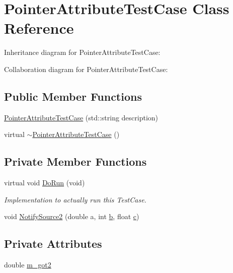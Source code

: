 \hypertarget{classPointerAttributeTestCase}{}\section{Pointer\+Attribute\+Test\+Case Class Reference}
\label{classPointerAttributeTestCase}


Inheritance diagram for Pointer\+Attribute\+Test\+Case\+:


Collaboration diagram for Pointer\+Attribute\+Test\+Case\+:
\subsection*{Public Member Functions}
\begin{DoxyCompactItemize}
\item 
\hyperlink{classPointerAttributeTestCase_a96191706656531cffa2a5f9305cc017a}{Pointer\+Attribute\+Test\+Case} (std\+::string description)
\item 
virtual \hyperlink{classPointerAttributeTestCase_a85d685a722e9657b63da389291973cbf}{$\sim$\+Pointer\+Attribute\+Test\+Case} ()
\end{DoxyCompactItemize}
\subsection*{Private Member Functions}
\begin{DoxyCompactItemize}
\item 
virtual void \hyperlink{classPointerAttributeTestCase_a4dd7258b7c7146be0a0ba69b9b5633d9}{Do\+Run} (void)
\begin{DoxyCompactList}\small\item\em Implementation to actually run this Test\+Case. \end{DoxyCompactList}\item 
void \hyperlink{classPointerAttributeTestCase_adb39bcf105f1cbc7345d27244dfcb3a9}{Notify\+Source2} (double a, int \hyperlink{lte__pathloss_8m_a21ad0bd836b90d08f4cf640b4c298e7c}{b}, float \hyperlink{mmwave_2model_2fading-traces_2fading__trace__generator_8m_ae0323a9039add2978bf5b49550572c7c}{c})
\end{DoxyCompactItemize}
\subsection*{Private Attributes}
\begin{DoxyCompactItemize}
\item 
double \hyperlink{classPointerAttributeTestCase_a2df5aaa8612f351f656e04f2999c2f1a}{m\+\_\+got2}
\end{DoxyCompactItemize}
